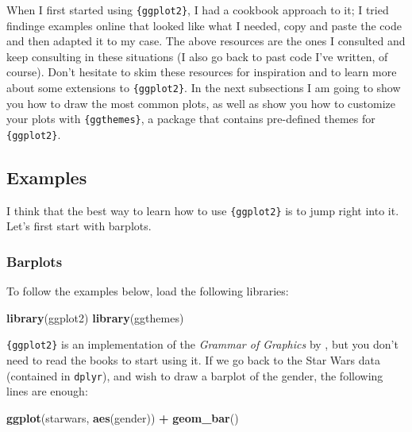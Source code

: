 \documentclass[
]{article}
\newenvironment{Shaded}{\begin{snugshade}}{\end{snugshade}}
\newcommand{\KeywordTok}[1]{\textcolor[rgb]{0.13,0.29,0.53}{\textbf{#1}}}
\newcommand{\NormalTok}[1]{#1}
\newcommand{\OperatorTok}[1]{\textcolor[rgb]{0.81,0.36,0.00}{\textbf{#1}}}
\newcommand{\StringTok}[1]{\textcolor[rgb]{0.31,0.60,0.02}{#1}}
\begin{document}
When I first started using \texttt{\{ggplot2\}}, I had a cookbook approach to it; I tried findinge examples
online that looked like what I needed, copy and paste the code and then adapted it to my case. The above resources
are the ones I consulted and keep consulting in these situations (I also go back to past code I've written, of
course). Don't hesitate to skim these resources for inspiration and to learn more about some
extensions to \texttt{\{ggplot2\}}. In the next subsections I am going to show you how to draw the most common
plots, as well as show you how to customize your plots with \texttt{\{ggthemes\}}, a package that contains pre-defined
themes for \texttt{\{ggplot2\}}.

\hypertarget{examples}{%
\subsection{Examples}\label{examples}}

I think that the best way to learn how to use \texttt{\{ggplot2\}} is to jump right into it. Let's first start with
barplots.

\hypertarget{barplots}{%
\subsubsection{Barplots}\label{barplots}}

To follow the examples below, load the following libraries:

\begin{Shaded}
\begin{Highlighting}[]
\KeywordTok{library}\NormalTok{(ggplot2)}
\KeywordTok{library}\NormalTok{(ggthemes)}
\end{Highlighting}
\end{Shaded}

\texttt{\{ggplot2\}} is an implementation of the \emph{Grammar of Graphics} by \citet{wilkinson2006}, but you don't need
to read the books to start using it. If we go back to the Star Wars data (contained in \texttt{dplyr}),
and wish to draw a barplot of the gender, the following lines are enough:

\begin{Shaded}
\begin{Highlighting}[]
\KeywordTok{ggplot}\NormalTok{(starwars, }\KeywordTok{aes}\NormalTok{(gender)) }\OperatorTok{+}
\StringTok{  }\KeywordTok{geom\_bar}\NormalTok{()}
\end{Highlighting}
\end{Shaded}
\end{document}
